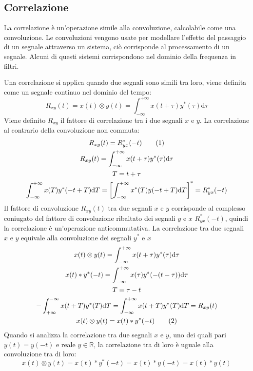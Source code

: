 \documentclass{article}
\newcommand{\df}{\mathrm{d}}
\newcommand{\tageq}{\tag{\stepcounter{equation}\theequation}}
\numberwithin{equation}{subsection}
\begin{document}
\subsection{Correlazione}
\label{sec:correlazione}
La correlazione è un'operazione simile alla convoluzione, calcolabile come una convoluzione. Le convoluzioni vengono usate per modellare l'effetto del passaggio di un segnale 
attraverso un sistema, ciò corrisponde al processamento di un segnale. Alcuni di questi sistemi corrispondono nel dominio della frequenza in filtri. 


Una correlazione si applica quando due segnali sono simili tra loro, viene definita come un segnale continuo nel dominio del tempo:
\begin{equation}
    R_{xy}(t)=x(t)\otimes y(t)=\int_{-\infty}^{+\infty}x(t+\tau)y^*(\tau)\df\tau
\end{equation}
Viene definito $R_{xy}$ il fattore di correlazione tra i due segnali $x$ e $y$. La correlazione al contrario della convoluzione non commuta: 
\begin{gather*}
    R_{xy}(t)=R_{yx}^*(-t)\tageq\\
    \displaystyle R_{xy}(t)=\int_{-\infty}^{+\infty}x(t+\tau)y^*(\tau)\df\tau\\
    T=t+\tau\\
    \displaystyle\int_{-\infty}^{+\infty}x(T)y^*(-t+T)\df T=\left[\int_{-\infty}^{+\infty}x^*(T)y(-t+T)\df T\right]^*=R_{yx}^*(-t)
\end{gather*}
Il fattore di convoluzione $R_{xy}(t)$ tra due segnali $x$ e $y$ corrisponde al complesso coniugato del fattore di convoluzione ribaltato dei segnali $y$ e $x$ $R_{yx}^*(-t)$, 
quindi la correlazione è un'operazione anticommutativa. La correlazione tra due segnali $x$ e $y$ equivale alla convoluzione dei segnali $y^*$ e $x$
\begin{gather*}
    x(t)\otimes y(t)=\displaystyle\int_{-\infty}^{+\infty}x(t+\tau)y^*(\tau)\df\tau\\
    x(t)*y^*(-t)=\displaystyle\int_{-\infty}^{+\infty}x(\tau)y^*(-(t-\tau))\df\tau\\
    T=\tau-t\\
    -\int_{+\infty}^{-\infty}x(t+T)y^*(T)\df T=\int_{-\infty}^{+\infty}x(t+T)y^*(T)\df T=R_{xy}(t)\\
    x(t)\otimes y(t)=x(t)*y^*(-t)\tageq
\end{gather*}
Quando si analizza la correlazione tra due segnali $x$ e $y$, uno dei quali pari $y(t)=y(-t)$ e reale $y\in\mathbb{R}$, la correlazione tra di loro è uguale alla convoluzione 
tra di loro:
\begin{equation*}
    x(t)\otimes y(t)=x(t)*y^*(-t)=x(t)*y(-t)=x(t)*y(t)
\end{equation*}
\end{document}

